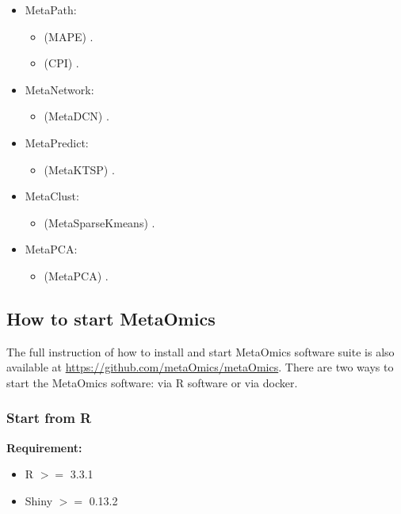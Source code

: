 \begin{itemize}
\item MetaPath: 
\begin{itemize}
\item (MAPE) .
\item (CPI) .
\end{itemize}

\item MetaNetwork: 
\begin{itemize}
\item (MetaDCN) .
\end{itemize}

\item MetaPredict: 
\begin{itemize}
\item (MetaKTSP) .
\end{itemize}

\item MetaClust: 
\begin{itemize}
\item (MetaSparseKmeans) .
\end{itemize}

\item MetaPCA: 

\begin{itemize}
\item (MetaPCA) .
\end{itemize}

\end{itemize}



\subsection{How to start MetaOmics}

The full instruction of how to install and start MetaOmics software suite is also available at \url{https://github.com/metaOmics/metaOmics}.
There are two ways to start the MetaOmics software:
via R software or via docker.


\subsubsection{Start from R}

\textbf{Requirement:}
\begin{itemize}
\item R $>=$ 3.3.1
\item Shiny $>=$ 0.13.2
\end{itemize}

